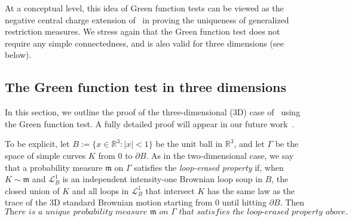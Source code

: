 \documentclass[11pt]{article}
\numberwithin{equation}{section}
\newcommand{\R}{\mathbb{R}}
\newcommand{\cL}{\mathcal{L}}
\newcommand{\1}{\mathbf{1}}
\begin{document}
At a conceptual level, this idea of Green function tests can be viewed as the negative central charge extension of~\cite{CG25} in proving the uniqueness of generalized restriction measures. We stress again that the Green function test does not require any simple connectedness, and is also valid for three dimensions (see below).

\subsection{The Green function test in three dimensions}\label{rmk:3d}

In this section, we outline the proof of the three-dimensional (3D) case of~\cite[Conjecture 1.3]{SS18} using the Green function test. A fully detailed proof will appear in our future work~\cite{CCLS26}.

To be explicit, let \(B:=\{x\in\R^3:|x|<1\}\) be the unit ball in $\R^3$, and let \(\Gamma\) be the space of simple curves $K$ from \(0\) to \(\partial B\). As in the two-dimensional case, we say that a probability measure $\mathfrak m$ on $\Gamma$ satisfies the \emph{loop-erased property} if, when $K\sim\mathfrak m$ and \(\cL_B^1\) is an independent intensity-one Brownian loop soup in $B$, the closed union of $K$ and all loops in \(\cL_B^1\) that intersect $K$ has the same law as the trace of the 3D standard Brownian motion starting from $0$ until hitting $\partial B$. Then
\begin{equation}\label{thm:appB-conditional-uniqueness}
\textit{There is a unique probability measure } \mathfrak m \textit{ on } \Gamma \textit{ that satisfies the loop-erased property above}.
\end{equation}
\end{document}
